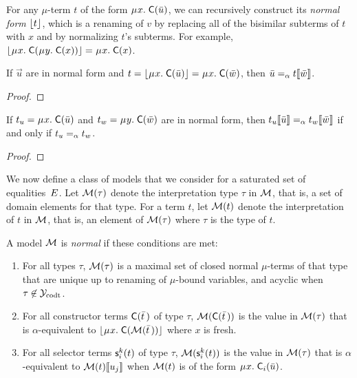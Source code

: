 For any $\mu$-term $t$ of the form $\MU x.\; \const C( \vec u )$, we can
recursively construct its \emph{normal form} $\lfloor t\rfloor$,
which is a renaming of $v$ by replacing all of the bisimilar subterms of $t$ with $x$
and by normalizing $t$'s subterms.
For example, $\nf{\MU x.\; \const{C}( \MU y.\; \const{C}( x ) )} = \MU x.\; \const{C}( x )$.

\begin{lemma}
\label{lem:mu-norm-arg}
If $\vec u$ are in normal form and $t = \nf{\MU x.\; \const{C}( \vec u )} = \MU x.\; \const{C}( \vec w )$,
then $\bar u \mathrel{=_\alpha} t\llbracket \bar w \rrbracket$.
\end{lemma}
\begin{proof}
\end{proof}

\begin{lemma}
\label{lem:mu-cong}
If $t_u = \MU x.\; \const{C}( \vec u )$ and $t_w = \MU y.\; \const{C}( \vec w )$ are in normal form,
then $t_u\llbracket  \bar u  \rrbracket \mathrel{=_\alpha} t_w\llbracket  \bar w  \rrbracket$ if and only if $t_u \mathrel{=_\alpha} t_w$.
\end{lemma}
\begin{proof}
\end{proof}

We now define a class of models that we consider for a saturated set of equalities~$E$.
Let $\mathcal{M}( \tau )$ denote the interpretation type $\tau$ in $\mathcal{M}$,
that is, a set of domain elements for that type.
For a term $t$, let $\mathcal{M}( t )$ denote the interpretation of $t$ in $\mathcal{M}$,
that is, an element of $\mathcal{M}( \tau )$ where $\tau$ is the type of $t$.

\begin{definition}
\afterDot%
\label{def:norm-model}%
\rm
A model $\mathcal{M}$ is \emph{normal} if these conditions are met:
\begin{enumerate}
\item
For all types $\tau$,
$\mathcal{M}( \tau )$ is a maximal set of closed normal $\mu$-terms of that type that are
unique up to renaming of $\mu$-bound variables,
and acyclic when $\tau \not\in \mathcal{Y}_{\mathrm{codt}}$.
\item
For all constructor terms $\textsf{C}( \bar t \,)$ of type $\tau$,
$\mathcal{M}( \textsf{C}( \bar t \,) )$ is the value
in $\mathcal{M}( \tau )$ that is $\alpha$-equivalent to
$\nf{\MU x.\; \const{C}( \M( \vec t \,) )}$ where $x$ is fresh.
\item
For all selector terms $\textsf{s}^k_i( t )$ of type $\tau$, %
$\mathcal{M}( \textsf{s}^k_i( t ) )$ is the value
in $\mathcal{M}( \tau )$ that is $\alpha$-equivalent to
$\mathcal{M}( t )\llbracket u_j \rrbracket$
when $\mathcal{M}( t )$ is of the form $\MU x.\; \const{C}_i( \vec u )$.
\end{enumerate}
\end{definition}

